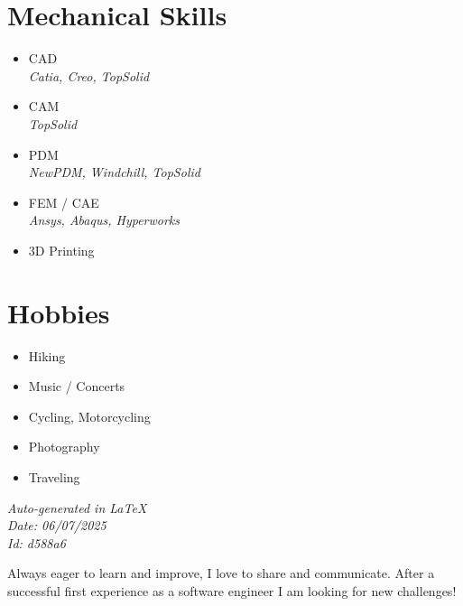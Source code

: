 \documentclass[]{friggeri-cv}
\begin{document}
\begin{aside}
\section{Mechanical Skills}
\begin{itemize}
\item CAD
 \\ \hspace*{0.2em}\small\textit{Catia, Creo, TopSolid}
\item CAM
 \\ \hspace*{0.2em}\small\textit{TopSolid}
\item PDM
 \\ \hspace*{0.2em}\small\textit{NewPDM, Windchill, TopSolid}
\item FEM / CAE
 \\ \hspace*{0.2em}\small\textit{Ansys, Abaqus, Hyperworks}
\item 3D Printing
\end{itemize}
\section{Hobbies}
\begin{itemize}
\item Hiking
\item Music / Concerts
\item Cycling, Motorcycling
\item Photography
\item Traveling
\end{itemize}
\vspace{2.5mm}%
\small \emph{Auto-generated in \LaTeX}\\
\small \emph{Date: 06/07/2025} \hspace*{8mm}\\
\small \emph{Id: d588a6} %

\end{aside}

\vspace*{-2.0mm}
\noindent\parbox{\linewidth}{
  \centering
  Always eager to learn and improve, I love to share and communicate. After a successful first experience as a software engineer I am looking for new challenges!
}
\vspace*{0.8mm}
\end{document}
